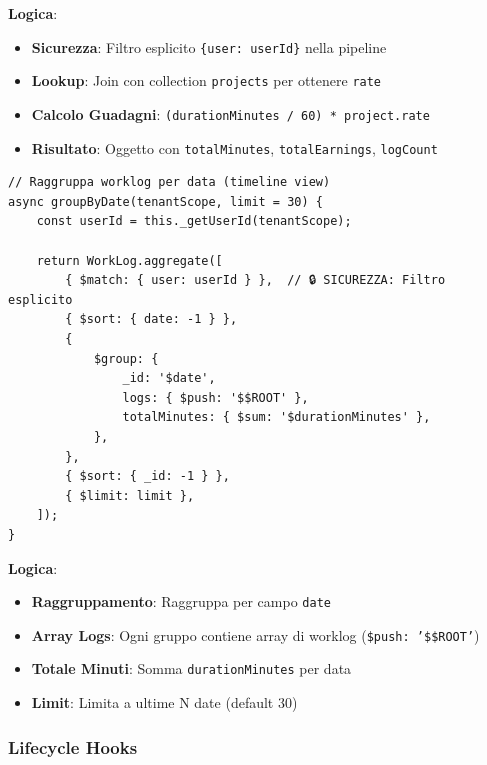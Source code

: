 \documentclass[11pt,a4paper]{article}
\begin{document}
\textbf{Logica}:
\begin{itemize}
    \item \textbf{Sicurezza}: Filtro esplicito \texttt{\{user: userId\}} nella pipeline
    \item \textbf{Lookup}: Join con collection \texttt{projects} per ottenere \texttt{rate}
    \item \textbf{Calcolo Guadagni}: \texttt{(durationMinutes / 60) * project.rate}
    \item \textbf{Risultato}: Oggetto con \texttt{totalMinutes}, \texttt{totalEarnings}, \texttt{logCount}
\end{itemize}

\begin{lstlisting}
// Raggruppa worklog per data (timeline view)
async groupByDate(tenantScope, limit = 30) {
    const userId = this._getUserId(tenantScope);
    
    return WorkLog.aggregate([
        { $match: { user: userId } },  // 🔒 SICUREZZA: Filtro esplicito
        { $sort: { date: -1 } },
        {
            $group: {
                _id: '$date',
                logs: { $push: '$$ROOT' },
                totalMinutes: { $sum: '$durationMinutes' },
            },
        },
        { $sort: { _id: -1 } },
        { $limit: limit },
    ]);
}
\end{lstlisting}

\textbf{Logica}:
\begin{itemize}
    \item \textbf{Raggruppamento}: Raggruppa per campo \texttt{date}
    \item \textbf{Array Logs}: Ogni gruppo contiene array di worklog (\texttt{\$push: '\$\$ROOT'})
    \item \textbf{Totale Minuti}: Somma \texttt{durationMinutes} per data
    \item \textbf{Limit}: Limita a ultime N date (default 30)
\end{itemize}

\subsubsection{Lifecycle Hooks}
\end{document}
